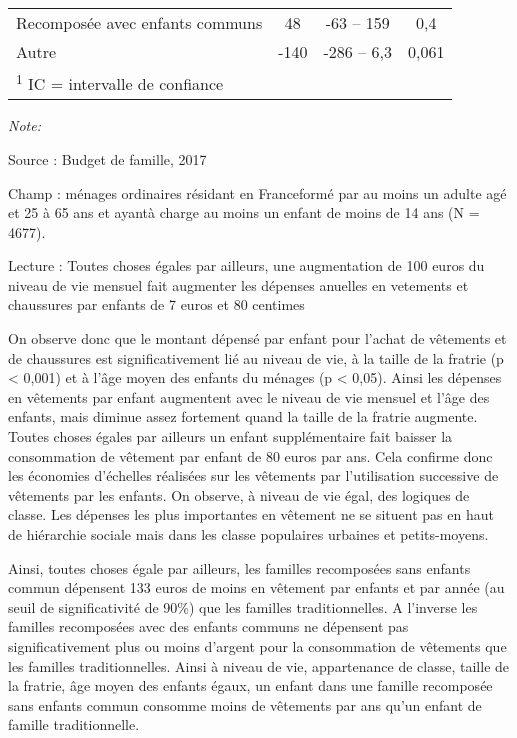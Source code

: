 \documentclass[
  12pt,
]{book}
\begin{document}
\begin{table}[!h]
{\begin{threeparttable}
\begin{tabular}[t]{lccc}
\hspace{1em}Recomposée avec enfants communs & 48 & -63 – 159 & 0,4\\
\hspace{1em}Autre & -140 & -286 – 6,3 & 0,061\\
\bottomrule
\multicolumn{4}{l}{\rule{0pt}{1em}\textsuperscript{1} IC = intervalle de confiance}\\
\end{tabular}
\begin{tablenotes}
\item \textit{Note: } 
\item Source : Budget de famille, 2017
\item Champ : ménages ordinaires résidant en Franceformé par au moins un adulte agé et 25 à 65 ans et ayantà charge au moins un enfant de moins de 14 ans (N = 4677).
\item Lecture : Toutes choses égales par ailleurs, une augmentation de 100 euros du niveau de vie mensuel fait augmenter les dépenses anuelles en vetements et chaussures par enfants de 7 euros et 80 centimes
\end{tablenotes}
\end{threeparttable}}
\end{table}

On observe donc que le montant dépensé par enfant pour l'achat de
vêtements et de chaussures est significativement lié au niveau de vie, à
la taille de la fratrie (p \textless{} 0,001) et à l'âge moyen des
enfants du ménages (p \textless{} 0,05). Ainsi les dépenses en vêtements
par enfant augmentent avec le niveau de vie mensuel et l'âge des
enfants, mais diminue assez fortement quand la taille de la fratrie
augmente. Toutes choses égales par ailleurs un enfant supplémentaire
fait baisser la consommation de vêtement par enfant de 80 euros par ans.
Cela confirme donc les économies d'échelles réalisées sur les vêtements
par l'utilisation successive de vêtements par les enfants. On observe, à
niveau de vie égal, des logiques de classe. Les dépenses les plus
importantes en vêtement ne se situent pas en haut de hiérarchie sociale
mais dans les classe populaires urbaines et petits-moyens.

Ainsi, toutes choses égale par ailleurs, les familles recomposées sans
enfants commun dépensent 133 euros de moins en vêtement par enfants et
par année (au seuil de significativité de 90\%) que les familles
traditionnelles. A l'inverse les familles recomposées avec des enfants
communs ne dépensent pas significativement plus ou moins d'argent pour
la consommation de vêtements que les familles traditionnelles. Ainsi à
niveau de vie, appartenance de classe, taille de la fratrie, âge moyen
des enfants égaux, un enfant dans une famille recomposée sans enfants
commun consomme moins de vêtements par ans qu'un enfant de famille
traditionnelle.
\end{document}
